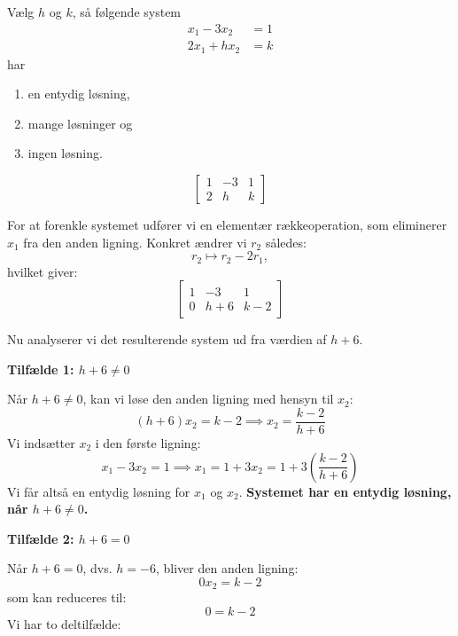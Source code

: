 \begin{example}
    \label{ex:unique-solution}
    Vælg $h$ og $k$, så følgende system
    \[
    \begin{aligned}
    x_1-3 x_2 & =1 \\
    2 x_1+h x_2 & =k
    \end{aligned}
    \]
    har
\begin{enumerate}[label=(\roman*)]
    \item en entydig løsning,
    \item mange løsninger og
    \item ingen løsning.
\end{enumerate}

\begin{solution}
        \[
        \left[\begin{array}{ccc}
        1 & -3 & 1 \\
        2 & h & k
        \end{array}\right]
        \]
        
        For at forenkle systemet udfører vi en elementær rækkeoperation, som eliminerer $x_1$ fra den anden ligning. Konkret ændrer vi $r_2$ således:
        \[
        r_2 \mapsto r_2 - 2r_1,
        \]
        hvilket giver:
        \[
        \left[\begin{array}{ccc}
        1 & -3 & 1 \\
        0 & h + 6 & k - 2
        \end{array}\right]
        \]
        
        Nu analyserer vi det resulterende system ud fra værdien af $h + 6$.
        
        \textbf{Tilfælde 1: $h + 6 \ne 0$}
        
        Når $h + 6 \ne 0$, kan vi løse den anden ligning med hensyn til $x_2$:
        \[
        (h + 6)x_2 = k - 2 \implies x_2 = \dfrac{k - 2}{h + 6}
        \]
        Vi indsætter $x_2$ i den første ligning:
        \[
        x_1 - 3x_2 = 1 \implies x_1 = 1 + 3x_2 = 1 + 3\left(\dfrac{k - 2}{h + 6}\right)
        \]
        Vi får altså en entydig løsning for $x_1$ og $x_2$. \textbf{Systemet har en entydig løsning, når $h + 6 \ne 0$.}
        
        \newpage

        \textbf{Tilfælde 2: $h + 6 = 0$}
        
        Når $h + 6 = 0$, dvs. $h = -6$, bliver den anden ligning:
        \[
        0x_2 = k - 2
        \]
        som kan reduceres til:
        \[
        0 = k - 2
        \]
        Vi har to deltilfælde:
        

\end{solution}
\end{example}
